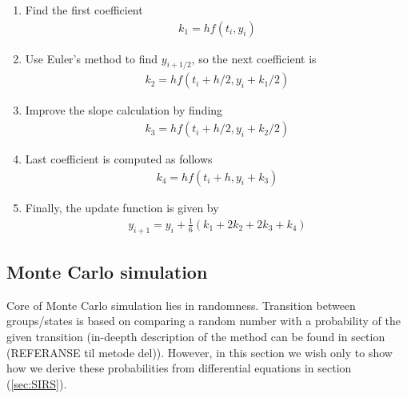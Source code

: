 \documentclass[a4paper, 10pt]{article}
\begin{document}
  \begin{enumerate}
  \item Find the first coefficient
    \begin{align*}
      k_{1} = hf(t_{i},y_{i})
    \end{align*}
  \item Use Euler's method to find $y_{i+1/2}$, so the next coefficient is
    \begin{align*}
      k_{2} = hf(t_{i}+h/2, y_{i}+k_{1}/2)
    \end{align*}
  \item Improve the slope calculation by finding
    \begin{align*}
      k_{3} = hf(t_{i} + h/2, y_{i}+k_{2}/2)
    \end{align*}
  \item Last coefficient is computed as follows
    \begin{align*}
      k_{4} = hf(t_{i} + h, y_{i} + k_{3})
    \end{align*}
  \item Finally, the update function is given by
    \begin{align*}
      y_{i+1} = y_{i} + \frac{1}{6}\left(k_{1} + 2k_{2} + 2k_{3} + k_{4}\right)
    \end{align*}
  \end{enumerate}



  \subsection{Monte Carlo simulation}
  Core of Monte Carlo simulation lies in randomness. Transition between
  groups/states is based on comparing a random number with a probability
  of the given transition (in-deepth description of the method can be found in
  section (REFERANSE til metode del)). However, in this section we wish only to
  show how we derive these probabilities from differential equations in section
  (\ref{sec:SIRS}).

  \vspace{3mm}
\end{document}
